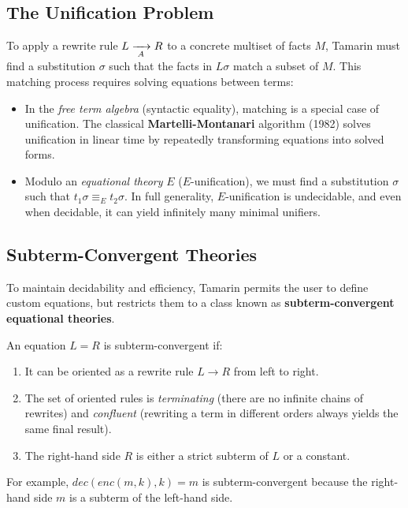 \subsection{The Unification Problem}

To apply a rewrite rule $L \xrightarrow[{\;A\;}]{} R$ to a concrete multiset of facts $M$, Tamarin must find a substitution $\sigma$ such that the facts in $L\sigma$ match a subset of $M$. This matching process requires solving equations between terms:
\begin{itemize}
  \item In the \emph{free term algebra} (syntactic equality), matching is a special case of unification. The classical \textbf{Martelli-Montanari} algorithm (1982) solves unification in linear time by repeatedly transforming equations into solved forms.
  \item Modulo an \emph{equational theory} $E$ ($E$-unification), we must find a substitution $\sigma$ such that $t_1\sigma \equiv_E t_2\sigma$. In full generality, $E$-unification is undecidable, and even when decidable, it can yield infinitely many minimal unifiers.
\end{itemize}

\subsection{Subterm-Convergent Theories}

To maintain decidability and efficiency, Tamarin permits the user to define custom equations, but restricts them to a class known as \textbf{subterm-convergent equational theories}. 

\begin{definition}
An equation $L = R$ is subterm-convergent if:
\begin{enumerate}
  \item It can be oriented as a rewrite rule $L \to R$ from left to right.
  \item The set of oriented rules is \emph{terminating} (there are no infinite chains of rewrites) and \emph{confluent} (rewriting a term in different orders always yields the same final result).
  \item The right-hand side $R$ is either a strict subterm of $L$ or a constant.
\end{enumerate}
\end{definition}

For example, $dec(enc(m, k), k) = m$ is subterm-convergent because the right-hand side $m$ is a subterm of the left-hand side. 

